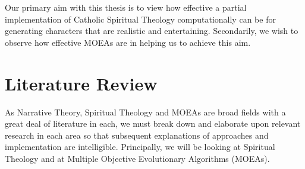 \documentclass[11pt]{article}
\begin{document}
Our primary aim with this thesis is to view how effective a partial implementation of Catholic Spiritual Theology computationally can be for generating characters that are realistic and entertaining. Secondarily, we wish to observe how effective MOEAs are in helping us to achieve this aim.\\ 
\section{Literature Review}
As Narrative Theory, Spiritual Theology and MOEAs are broad fields with a great deal of literature in each, we must break down and elaborate upon relevant research in each area so that subsequent explanations of approaches and implementation are intelligible. Principally, we will be looking at Spiritual Theology and at Multiple Objective Evolutionary Algorithms (MOEAs).\\
\end{document}
